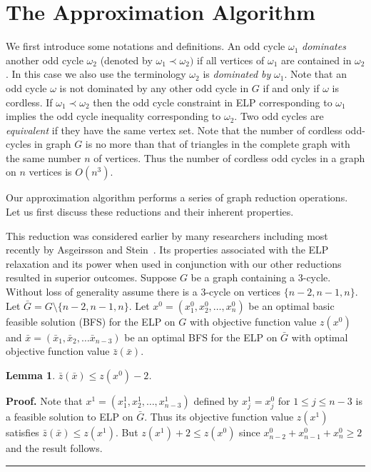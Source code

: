 \documentclass[12pt]{article}
\newtheorem{lemma}{Lemma}
\newenvironment{proof}[1][Proof]{\textbf{#1.} }{\ \rule{0.5em}{0.5em}}
\begin{document}
\section{The Approximation Algorithm}\label{ELPA}
We first introduce some notations and
definitions. An odd cycle $\omega_1$ \emph{dominates} another odd
cycle $\omega_2$ (denoted by $\omega_1\prec \omega_2)$ if all
vertices of $\omega_1$ are contained in $\omega_2$. In this case
we also use the terminology $\omega_2$ is \emph{dominated by}
$\omega_1$. Note that an odd cycle $\omega$ is not dominated by
any other odd cycle in $G$ if and only if $\omega$ is cordless. If
$\omega_1 \prec \omega_2$ then the odd cycle constraint in ELP
corresponding to $\omega_1$ implies the odd cycle inequality
corresponding to $\omega_2$.  Two odd cycles are \emph{equivalent}
if they have the same vertex set. Note that the number of cordless
odd-cycles in graph $G$ is no more than that of triangles in the
complete graph with the same number $n$ of vertices. Thus the
number of cordless odd cycles in a graph on $n$ vertices is  $
O(n^3)$.

\vskip 5pt

Our approximation algorithm performs a series of graph reduction
operations. Let us first discuss these reductions and their inherent
properties.

\vskip 5pt

 This reduction was considered
earlier by many researchers including most recently by Asgeirsson
and Stein~\cite{stein,stein1}. Its properties associated with the
ELP relaxation and its power when used in conjunction with our other
reductions resulted in superior outcomes. Suppose $G$ be a graph
containing a 3-cycle. Without loss of generality assume there is a
3-cycle on vertices $\{n-2,n-1,n\}$. Let $\bar{G}=G\setminus
\{n-2,n-1,n\}$. Let $x^0=(x_1^0,x_2^0,\ldots ,x_n^0)$ be an optimal
basic feasible solution (BFS) for the ELP on $G$ with objective
function value $z(x^0)$ and $\bar{x}=(\bar{x}_1,\bar{x}_2,\ldots
\bar{x}_{n-3})$ be an optimal BFS for the ELP on $\bar{G}$ with
optimal objective function value $\bar{z}(\bar{x})$.
\begin{lemma}\label{3c1}$\bar{z}(\bar{x})\leq z(x^0)-2$.\end{lemma}
\begin{proof}Note that $x^1=(x^1_1,x^1_2,\ldots ,x^1_{n-3})$  defined by $x^1_j=x^0_j$ for
 $1\leq j \leq n-3$ is a feasible solution
to ELP on $\bar{G}$. Thus its objective function value $z(x^1)$
satisfies $\bar{z}(\bar{x}) \leq z(x^1)$. But $z(x^1)+2 \leq z(x^0)$
since $x^0_{n-2}+x^0_{n-1}+x^0_{n}\geq 2$ and the result follows.
\end{proof}
\end{document}
